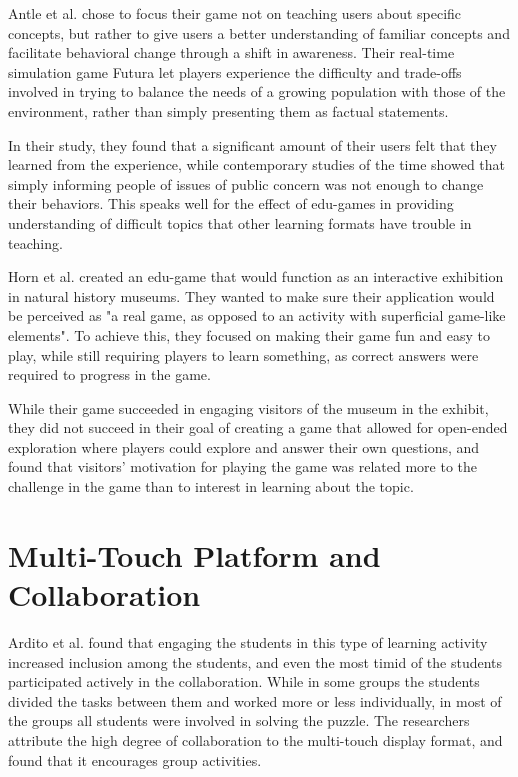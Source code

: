 Antle et al.\citep{AntleFutura} chose to focus their game not on teaching users about specific concepts, but rather to give users a better understanding of familiar concepts and facilitate behavioral change through a shift in awareness. Their real-time simulation game Futura let players experience the difficulty and trade-offs involved in trying to balance the needs of a growing population with those of the environment, rather than simply presenting them as factual statements.

In their study, they found that a significant amount of their users felt that they learned from the experience, while contemporary studies of the time showed that simply informing people of issues of public concern was not enough to change their behaviors. This speaks well for the effect of edu-games in providing understanding of difficult topics that other learning formats have trouble in teaching.

Horn et al.\citep{BAT} created an edu-game that would function as an interactive exhibition in natural history museums. They wanted to make sure their application would be perceived as "a real game, as opposed to an activity with superficial game-like elements". To achieve this, they focused on making their game fun and easy to play, while still requiring players to learn something, as correct answers were required to progress in the game.

While their game succeeded in engaging visitors of the museum in the exhibit, they did not succeed in their goal of creating a game that allowed for open-ended exploration where players could explore and answer their own questions, and found that visitors' motivation for playing the game was related more to the challenge in the game than to interest in learning about the topic.


\section{Multi-Touch Platform and Collaboration}

Ardito et al. found that engaging the students in this type of learning activity increased inclusion among the students, and even the most timid of the students participated actively in the collaboration. While in some groups the students divided the tasks between them and worked more or less individually, in most of the groups all students were involved in solving the puzzle. The researchers attribute the high degree of collaboration to the multi-touch display format, and found that it encourages group activities.

